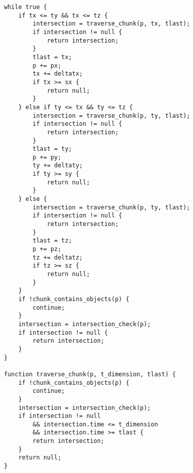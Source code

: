 \begin{verbatim}
while true {
    if tx <= ty && tx <= tz {
        intersection = traverse_chunk(p, tx, tlast);
        if intersection != null {
            return intersection;
        }
        tlast = tx;
        p += px;
        tx += deltatx;
        if tx >= sx {
            return null;
        }
    } else if ty <= tx && ty <= tz {
        intersection = traverse_chunk(p, ty, tlast);
        if intersection != null {
            return intersection;
        }
        tlast = ty;
        p += py;
        ty += deltaty;
        if ty >= sy {
            return null;
        }
    } else {
        intersection = traverse_chunk(p, ty, tlast);
        if intersection != null {
            return intersection;
        }
        tlast = tz;
        p += pz;
        tz += deltatz;
        if tz >= sz {
            return null;
        }
	}
    if !chunk_contains_objects(p) {
        continue;
    }
    intersection = intersection_check(p);
    if intersection != null {
        return intersection;
    }
}

function traverse_chunk(p, t_dimension, tlast) {
    if !chunk_contains_objects(p) {
        continue;
    }
    intersection = intersection_check(p);
    if intersection != null 
        && intersection.time <= t_dimension
        && intersection.time >= tlast {
        return intersection;
    }
    return null;
}
\end{verbatim}

